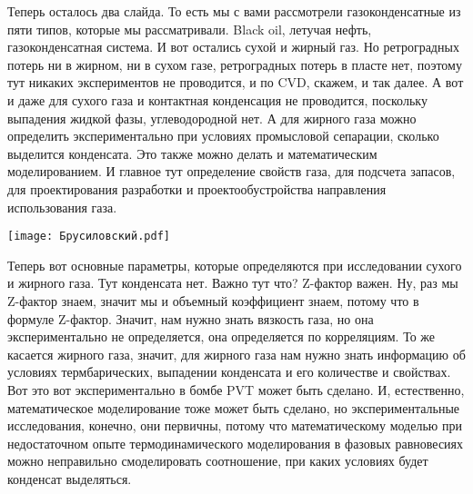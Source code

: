\documentclass[main.tex]{subfiles}
\begin{document}
Теперь осталось два слайда.
То есть мы с вами рассмотрели газоконденсатные из пяти типов, которые мы рассматривали.
Black oil, летучая нефть, газоконденсатная система.
И вот остались сухой и жирный газ.
Но ретроградных потерь ни в жирном, ни в сухом газе, ретроградных потерь в пласте нет, поэтому тут никаких экспериментов не проводится, и по CVD, скажем, и так далее.
А вот и даже для сухого газа и контактная конденсация не проводится, поскольку выпадения жидкой фазы, углеводородной нет.
А для жирного газа можно определить экспериментально при условиях промысловой сепарации, сколько выделится конденсата.
Это также можно делать и математическим моделированием.
И главное тут определение свойств газа, для подсчета запасов,
для проектирования разработки и проектообустройства направления использования газа.

\begin{center}
\texttt{[image: Брусиловский.pdf]}
\end{center}

Теперь вот основные параметры, которые определяются при исследовании сухого и жирного газа.
Тут конденсата нет.
Важно тут что?
Z-фактор важен.
Ну, раз мы Z-фактор знаем, значит мы и объемный коэффициент знаем, потому что в формуле Z-фактор.
Значит, нам нужно знать вязкость газа, но она экспериментально не определяется, она определяется по корреляциям.
То же касается жирного газа, значит, для жирного газа нам нужно знать информацию об условиях термбарических, выпадении конденсата и его количестве и свойствах.
Вот это вот экспериментально в бомбе PVT может быть сделано.
И, естественно, математическое моделирование тоже может быть сделано, но
экспериментальные исследования, конечно, они первичны, потому что математическому моделью при недостаточном опыте термодинамического моделирования в фазовых равновесиях можно неправильно смоделировать соотношение, при каких условиях будет конденсат выделяться.
\end{document}
